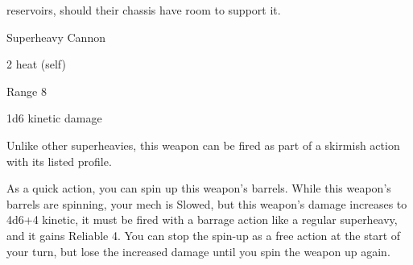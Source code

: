 reservoirs, should their chassis have room to support it.

Superheavy Cannon

2 heat (self)

Range 8

1d6 kinetic damage


Unlike other superheavies, this weapon can be fired as part of a skirmish action with its listed
profile.

As a quick action, you can spin up this weapon’s barrels. While this weapon’s barrels are
spinning, your mech is Slowed, but this weapon’s damage increases to 4d6+4 kinetic, it must be
fired with a barrage action like a regular superheavy, and it gains Reliable 4. You can stop the
spin-up as a free action at the start of your turn, but lose the increased damage until you spin the
weapon up again.
